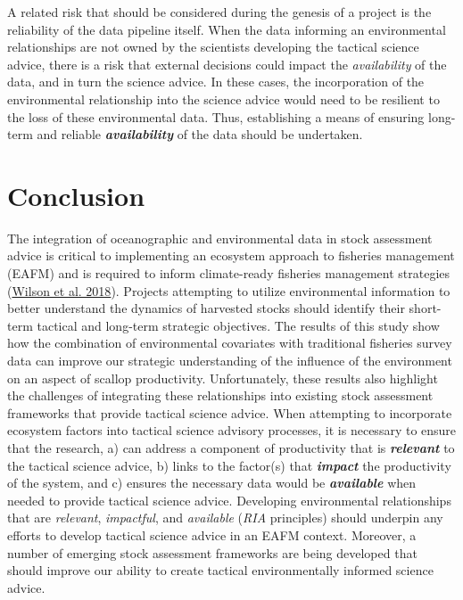 \documentclass[
]{article}
\begin{document}
A related risk that should be considered during the genesis of a project is the reliability of the data pipeline itself. When the data informing an environmental relationships are not owned by the scientists developing the tactical science advice, there is a risk that external decisions could impact the \emph{availability} of the data, and in turn the science advice. In these cases, the incorporation of the environmental relationship into the science advice would need to be resilient to the loss of these environmental data. Thus, establishing a means of ensuring long-term and reliable \textbf{\emph{availability}} of the data should be undertaken.

\hypertarget{conclusion}{%
\section{Conclusion}\label{conclusion}}

The integration of oceanographic and environmental data in stock assessment advice is critical to implementing an ecosystem approach to fisheries management (EAFM) and is required to inform climate-ready fisheries management strategies (\protect\hyperlink{ref-wilsonAdaptiveComanagementAchieve2018}{Wilson et al. 2018}). Projects attempting to utilize environmental information to better understand the dynamics of harvested stocks should identify their short-term tactical and long-term strategic objectives. The results of this study show how the combination of environmental covariates with traditional fisheries survey data can improve our strategic understanding of the influence of the environment on an aspect of scallop productivity. Unfortunately, these results also highlight the challenges of integrating these relationships into existing stock assessment frameworks that provide tactical science advice. When attempting to incorporate ecosystem factors into tactical science advisory processes, it is necessary to ensure that the research, a) can address a component of productivity that is \textbf{\emph{relevant}} to the tactical science advice, b) links to the factor(s) that \textbf{\emph{impact}} the productivity of the system, and c) ensures the necessary data would be \textbf{\emph{available}} when needed to provide tactical science advice. Developing environmental relationships that are \emph{relevant}, \emph{impactful}, and \emph{available} (\emph{RIA} principles) should underpin any efforts to develop tactical science advice in an EAFM context. Moreover, a number of emerging stock assessment frameworks are being developed that should improve our ability to create tactical environmentally informed science advice.
\end{document}
